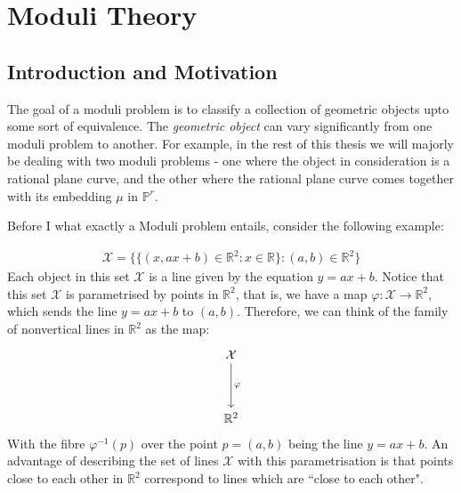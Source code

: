 \section{Moduli Theory}
\subsection{Introduction and Motivation}
The goal of a moduli problem is to classify a collection of geometric objects upto some sort of equivalence.
The \textit{geometric object} can vary significantly from one moduli problem to another. 
For example, in the rest of this thesis we will majorly be dealing with two moduli problems - one where the object in consideration is a rational plane curve, and the other where the rational plane curve comes together with its embedding $\mu$ in $\mathbb{P}^{r}$.

Before I what exactly a Moduli problem entails, consider the following example:

\begin{example}
    \label{exLinesInPlane}
\begin{align*}
    \mathcal{X} = \{\{(x, ax + b) \in \mathbb{R}^{2}: x \in \mathbb{R}\} : (a,b) \in \mathbb{R}^{2}\}
\end{align*}
Each object in this set $\mathcal{X}$ is a line given by the equation $y = ax + b$.
Notice that this set $\mathcal{X}$ is parametrised by points in $\mathbb{R}^{2}$, that is, we have a map $\varphi: \mathcal{X} \to \mathbb{R}^{2}$, which sends the line $y = ax + b$ to $(a,b)$.  
Therefore, we can think of the family of nonvertical lines in $\mathbb{R}^{2}$ as the map:
\[\begin{tikzcd}
	{\mathcal{X}} \\
	\\
	{\mathbb{R}^2}
	\arrow["\varphi",from=1-1, to=3-1]
\end{tikzcd}\]
With the fibre $\varphi^{-1}(p)$ over the point $p = (a,b)$ being the line $y = ax + b$.
An advantage of describing the set of lines $\mathcal{X}$ with this parametrisation is that points close to each other in $\mathbb{R}^{2}$ correspond to lines which are ``close to each other".  

\end{example}

